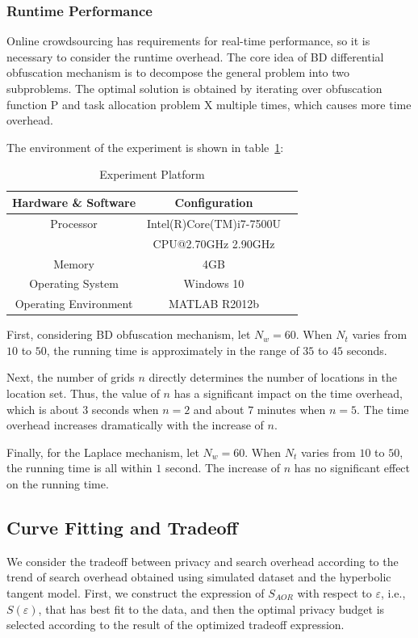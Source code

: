 \subsubsection{Runtime Performance}
Online crowdsourcing has requirements for real-time performance, so it is necessary to consider the runtime overhead. The core idea of BD differential obfuscation mechanism is to decompose the general problem into two subproblems. The optimal solution is obtained by iterating over obfuscation function P and task allocation problem X multiple times, which causes more time overhead.

The environment of the experiment is shown in table~\ref{tab:envi}:
\begin{table}
  \caption{Experiment Platform}
  \label{tab:envi}
  \begin{tabular}{ccl}
    \toprule
    Hardware \& Software & Configuration\\
    \midrule
    Processor & Intel(R)Core(TM)i7-7500U \\
              & CPU@2.70GHz 2.90GHz\\
    Memory & 4GB\\
    Operating System & Windows 10\\
    Operating Environment & MATLAB R2012b\\
  \bottomrule
\end{tabular}
\end{table}

First, considering BD obfuscation mechanism, let $N_w=60$. When $N_t$ varies from $10$ to $50$, the running time is approximately in the range of $35$ to $45$ seconds.

Next, the number of grids $n$ directly determines the number of locations in the location set. Thus, the value of $n$ has a significant impact on the time overhead, which is about $3$ seconds when $n=2$ and about $7$ minutes when $n=5$. The time overhead increases dramatically with the increase of $n$.

Finally, for the Laplace mechanism, let $N_w=60$. When $N_t$ varies from $10$ to $50$, the running time is all within $1$ second. The increase of $n$ has no significant effect on the running time.

\subsection{Curve Fitting and Tradeoff} %
We consider the tradeoff between privacy and search overhead according to the trend of search overhead obtained using simulated dataset and the hyperbolic tangent model. First, we construct the expression of $S_{AOR}$ with respect to $\varepsilon$, i.e., $S(\varepsilon)$, that has best fit to the data, and then the optimal privacy budget is selected according to the result of the optimized tradeoff expression.

